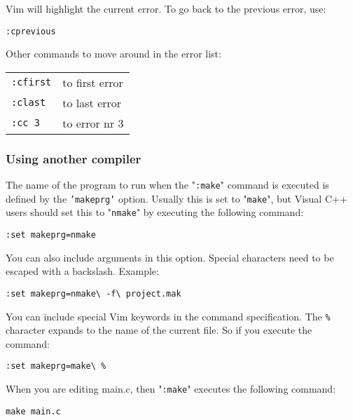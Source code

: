 Vim will highlight the current error.
To go back to the previous error, use:

\begin{Verbatim}[samepage=true]
 :cprevious
\end{Verbatim}

Other commands to move around in the error list:

\begin{center} \begin{tabular}{l l}
				\texttt{:cfirst} & to first error \\
				\texttt{:clast} & to last error \\
				\texttt{:cc 3} & to error nr 3 \\
\end{tabular} \end{center}

\subsubsection{Using another compiler}
The name of the program to run when the "\texttt{:make}" command is executed is defined by the \texttt{'makeprg'} option.
Usually this is set to "\texttt{make}", but Visual C++ users should set this to "\texttt{nmake}" by executing the following command:

\begin{Verbatim}[samepage=true]
 :set makeprg=nmake
\end{Verbatim}

You can also include arguments in this option.
Special characters need to be escaped with a backslash.
Example:

\begin{Verbatim}[samepage=true]
 :set makeprg=nmake\ -f\ project.mak
\end{Verbatim}

You can include special Vim keywords in the command specification.
The \texttt{\%} character expands to the name of the current file.
So if you execute the command:

\begin{Verbatim}[samepage=true]
 :set makeprg=make\ %
\end{Verbatim}

When you are editing main.c, then "\texttt{:make}" executes the following command:

\begin{Verbatim}[samepage=true]
 make main.c
\end{Verbatim}

